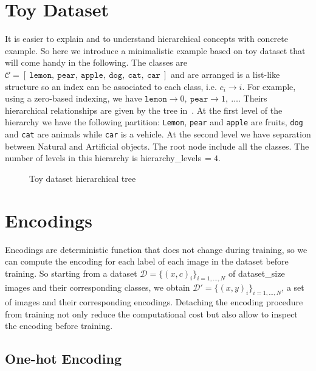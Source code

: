 \section{Toy Dataset}
\label{sec:toy-dataset}
It is easier to explain and to understand hierarchical concepts with concrete
example. So here we introduce a minimalistic example based on toy dataset that
will come handy in the following. The classes are $\mathcal{C} = [\
\texttt{lemon},\ \texttt{pear},\ \texttt{apple},\ \texttt{dog},\ \texttt{cat},\
\texttt{car}\ ]$ and are arranged is a list-like structure so an index can be
associated to each class, i.e. $c_i \to i$. For example, using a zero-based
indexing, we have $\texttt{lemon} \to 0,\ \texttt{pear} \to 1,\ \ldots$. Theirs
hierarchical relationships are given by the tree in~\Cref{fig:2_toy-dataset}. At
the first level of the hierarchy we have the following partition:
\texttt{Lemon}, \texttt{pear} and \texttt{apple} are fruits, \texttt{dog} and
\texttt{cat} are animals while \texttt{car} is a vehicle. At the second level we
have separation between Natural and Artificial objects. The root node include all
the classes. The number of levels in this hierarchy is
\gls{hierarchy_levels}$\,=4$.
\begin{figure}[htbp]
  \caption{Toy dataset hierarchical tree}
  \label{fig:2_toy-dataset}
\end{figure}

\section{Encodings}
\label{sec:encodings}

Encodings are deterministic function that does not change during training, so
we can compute the encoding for each label of each image in the dataset before
training. So starting from a dataset $\mathcal{D} = \{ \left(x, c\right)_i
\}_{i = 1, \ldots, N}$ of \gls{dataset_size} images and their corresponding
classes, we obtain $\mathcal{D}' = \{ \left(x, y\right)_i \}_{i = 1, \ldots,
N}$, a set of images and their corresponding encodings. Detaching the encoding
procedure from training not only reduce the computational cost but also allow to
inspect the encoding before training.


\subsection{One-hot Encoding}
\label{subsec:one-hot-encoding}

